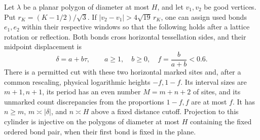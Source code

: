 \begin{lemma}\label{c7:selected-pair}
Let $\lambda$ be a planar polygon of diameter at most $H$, and let
$v_1,v_2$ be good vertices. Put $r_K=(K-1/2)/\sqrt3$. If
$|v_2-v_1|>4\sqrt{19}\,r_K$, one can assign used bonds $e_1,e_2$ within
their respective windows so that the following holds after a lattice
rotation or reflection. Both bonds cross horizontal tessellation sides,
and their midpoint displacement is
\[
 \delta=a+b\tau,\qquad a\ge1,\quad b\ge0,\quad
 f=\frac{b}{a+b}<0.6.
\]
There is a permitted cut with these two horizontal marked sites and,
after a common rescaling, physical logarithmic heights $-f,1-f$. Its
interval sizes are $m+1,n+1$, its period has an even number
$M=m+n+2$ of sites, and its unmarked count discrepancies from the
proportions $1-f,f$ are at most $f$. It has $n\ge m$,
$m\asymp|\delta|$, and $n\asymp H$
above a fixed distance cutoff. Projection to this cylinder is injective
on the polygons of diameter at most $H$ containing the fixed ordered
bond pair, when their first bond is fixed in the plane.
\end{lemma}

